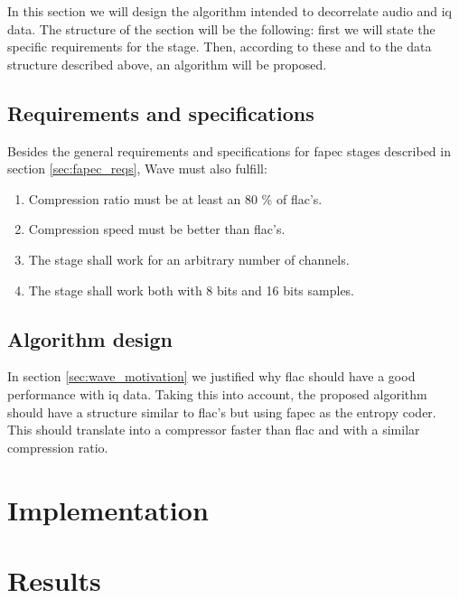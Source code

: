 In this section we will design the algorithm intended to decorrelate audio and \acrshort{iq} data. The structure of the section will be the following: first we will state the specific requirements for the stage. Then, according to these and to the data structure described above, an algorithm will be proposed.

\subsection{Requirements and specifications}
Besides the general requirements and specifications for \acrshort{fapec} stages described in section \ref{sec:fapec_reqs}, Wave must also fulfill:
\begin{enumerate}
	\item Compression ratio must be at least an 80 \% of \acrshort{flac}'s.
	\item Compression speed must be better than \acrshort{flac}'s.
	\item The stage shall work for an arbitrary number of channels.
	\item The stage shall work both with 8 bits and 16 bits samples.
\end{enumerate}

\subsection{Algorithm design}
In section \ref{sec:wave_motivation} we justified why \acrshort{flac} should have a good performance with \acrshort{iq} data. Taking this into account, the proposed algorithm should have a structure similar to \acrshort{flac}'s but using \acrshort{fapec} as the entropy coder. This should translate into a compressor faster than \acrshort{flac} and with a similar compression ratio.

\section{Implementation}

\section{Results}

